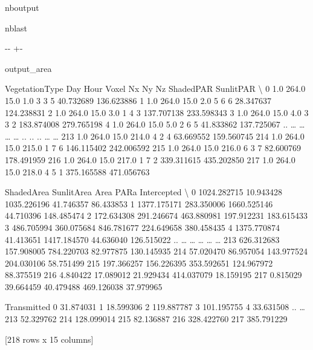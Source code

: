 \documentclass[letterpaper,10pt,english]{sphinxmanual}
\begin{document}
\begin{sphinxuseclass}{nboutput}
\begin{sphinxuseclass}{nblast}
{

\kern-\sphinxverbatimsmallskipamount\kern-\baselineskip
\kern+\FrameHeightAdjust\kern-\fboxrule
\vspace{\nbsphinxcodecellspacing}

\begin{sphinxuseclass}{output_area}
\begin{sphinxuseclass}{}


\begin{sphinxVerbatim}[commandchars=\\\{\}]
     VegetationType    Day  Hour  Voxel  Nx  Ny  Nz   ShadedPAR   SunlitPAR  \textbackslash{}
0               1.0  264.0  15.0    1.0   3   3   5   40.732689  136.623886
1               1.0  264.0  15.0    2.0   5   6   6   28.347637  124.238831
2               1.0  264.0  15.0    3.0   1   4   3  137.707138  233.598343
3               1.0  264.0  15.0    4.0   3   3   2  183.874008  279.765198
4               1.0  264.0  15.0    5.0   2   6   5   41.833862  137.725067
..              {\ldots}    {\ldots}   {\ldots}    {\ldots}  ..  ..  ..         {\ldots}         {\ldots}
213             1.0  264.0  15.0  214.0   4   2   4   63.669552  159.560745
214             1.0  264.0  15.0  215.0   1   7   6  146.115402  242.006592
215             1.0  264.0  15.0  216.0   6   3   7   82.600769  178.491959
216             1.0  264.0  15.0  217.0   1   7   2  339.311615  435.202850
217             1.0  264.0  15.0  218.0   4   5   1  375.165588  471.056763

      ShadedArea  SunlitArea         Area        PARa  Intercepted  \textbackslash{}
0    1024.282715   10.943428  1035.226196   41.746357    86.433853
1    1377.175171  283.350006  1660.525146   44.710396   148.485474
2     172.634308  291.246674   463.880981  197.912231   183.615433
3     486.705994  360.075684   846.781677  224.649658   380.458435
4    1375.770874   41.413651  1417.184570   44.636040   126.515022
..           {\ldots}         {\ldots}          {\ldots}         {\ldots}          {\ldots}
213   626.312683  157.908005   784.220703   82.977875   130.145935
214    57.020470   86.957054   143.977524  204.030106    58.751499
215   197.366257  156.226395   353.592651  124.967972    88.375519
216     4.840422   17.089012    21.929434  414.037079    18.159195
217     0.815029   39.664459    40.479488  469.126038    37.979965

     Transmitted
0      31.874031
1      18.599306
2     119.887787
3     101.195755
4      33.631508
..           {\ldots}
213    52.329762
214   128.099014
215    82.136887
216   328.422760
217   385.791229

[218 rows x 15 columns]
\end{sphinxVerbatim}



\end{sphinxuseclass}
\end{sphinxuseclass}
}

\end{sphinxuseclass}
\end{sphinxuseclass}
\end{document}
